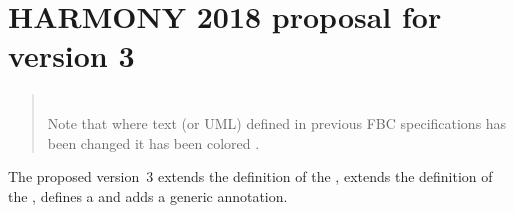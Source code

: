 
\newpage
\section{HARMONY 2018 proposal for \FBC version 3}

\begin{quote}
 \\ Note that where text (or UML) defined in previous FBC specifications has been changed it has been colored .
\end{quote}

The proposed \FBCPackage version~3 extends the definition of the \FluxObjective, extends the definition of the , defines a \UserConstraint and adds a generic \KeyValuePair annotation.


